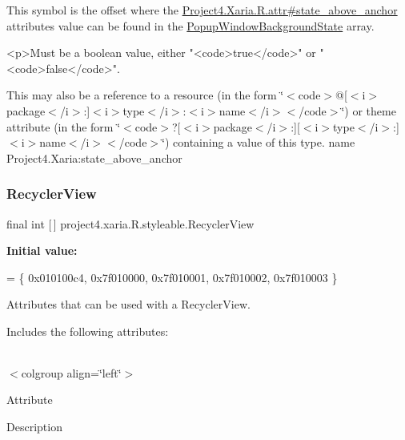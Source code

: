 This symbol is the offset where the \hyperlink{}{Project4.\+Xaria.\+R.\+attr\#state\+\_\+above\+\_\+anchor} attribute\textquotesingle{}s value can be found in the \hyperlink{classproject4_1_1xaria_1_1R_1_1styleable_a00ba6404cc13671fe72e09b01c9d644f}{Popup\+Window\+Background\+State} array.

\begin{DoxyVerb}      <p>Must be a boolean value, either "<code>true</code>" or "<code>false</code>".
\end{DoxyVerb}
 

This may also be a reference to a resource (in the form \char`\"{}$<$code$>$@\mbox{[}$<$i$>$package$<$/i$>$\+:\mbox{]}$<$i$>$type$<$/i$>$\+:$<$i$>$name$<$/i$>$$<$/code$>$\char`\"{}) or theme attribute (in the form \char`\"{}$<$code$>$?\mbox{[}$<$i$>$package$<$/i$>$\+:\mbox{]}\mbox{[}$<$i$>$type$<$/i$>$\+:\mbox{]}$<$i$>$name$<$/i$>$$<$/code$>$\char`\"{}) containing a value of this type.  name Project4.\+Xaria\+:state\+\_\+above\+\_\+anchor \mbox{\label{classproject4_1_1xaria_1_1R_1_1styleable_ad70c99b52204a6206f85345454bda20d}} 
\subsubsection{\texorpdfstring{Recycler\+View}{RecyclerView}}
{\footnotesize\ttfamily final int \mbox{[}$\,$\mbox{]} project4.\+xaria.\+R.\+styleable.\+Recycler\+View\hspace{0.3cm}{\ttfamily [static]}}

{\bfseries Initial value\+:}
\begin{DoxyCode}
= \{
            0x010100c4, 0x7f010000, 0x7f010001, 0x7f010002,
            0x7f010003
        \}
\end{DoxyCode}
Attributes that can be used with a Recycler\+View. 

Includes the following attributes\+:

\tabulinesep=1mm
\begin{longtabu} spread 0pt [c]{*{0}{|X[-1]}|}
\hline
\end{longtabu}
$<$colgroup align=\char`\"{}left\char`\"{}$>$ 

Attribute

Description 

